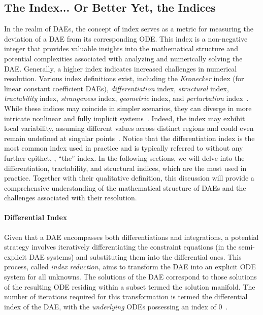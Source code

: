 \subsection{The Index... Or Better Yet, the Indices}

In the realm of \acp{DAE}, the concept of index serves as a metric for measuring the deviation of a \ac{DAE} from its corresponding \ac{ODE}. This index is a non-negative integer that provides valuable insights into the mathematical structure and potential complexities associated with analyzing and numerically solving the \ac{DAE}. Generally, a higher index indicates increased challenges in numerical resolution. Various index definitions exist, including the \emph{Kronecker} index (for linear constant coefficient \acp{DAE}), \emph{differentiation} index, \emph{structural} index, \emph{tractability} index, \emph{strangeness} index, \emph{geometric} index, and \emph{perturbation} index~\cite{mehrmann2015index}. While these indices may coincide in simpler scenarios, they can diverge in more intricate nonlinear and fully implicit systems~\cite{lamour2012detecting}. Indeed, the index may exhibit local variability, assuming different values across distinct regions and could even remain undefined at singular points~\cite{lamour2012detecting}. Notice that the differentiation index is the most common index used in practice and is typically referred to without any further epithet, \ie{}, ``the'' index. In the following sections, we will delve into the differentiation, tractability, and structural indices, which are the most used in practice. Together with their qualitative definition, this discussion will provide a comprehensive understanding of the mathematical structure of \acp{DAE} and the challenges associated with their resolution.

\paragraph{Differential Index}

Given that a \ac{DAE} encompasses both differentiations and integrations, a potential strategy involves iteratively differentiating the constraint equations (in the semi-explicit \ac{DAE} systems) and substituting them into the differential ones. This process, called \emph{index reduction}, aims to transform the \ac{DAE} into an explicit \ac{ODE} system for all unknowns. The solutions of the \ac{DAE} correspond to those solutions of the resulting \ac{ODE} residing within a subset termed the solution manifold. The number of iterations required for this transformation is termed the differential index of the \ac{DAE}, with the \emph{underlying} \acp{ODE} possessing an index of 0~\cite{mehrmann2015index}.


